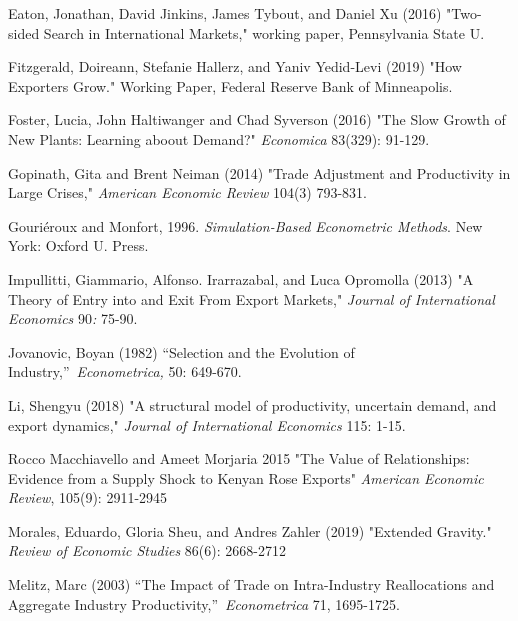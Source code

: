 \documentclass[12pt]{article}
\begin{document}
\begin{description}
\item Eaton, Jonathan, David Jinkins, James Tybout, and Daniel Xu (2016)
"Two-sided Search in International Markets," working paper, Pennsylvania
State U.

\item Fitzgerald, Doireann, Stefanie Hallerz, and Yaniv Yedid-Levi (2019)
"How Exporters Grow." Working Paper, Federal Reserve Bank of Minneapolis.

\item Foster, Lucia, John Haltiwanger and Chad Syverson (2016) "The Slow
Growth of New Plants: Learning aboout Demand?" \textit{Economica} 83(329):
91-129.

\item Gopinath, Gita and Brent Neiman (2014) "Trade Adjustment and
Productivity in Large Crises," \textit{American Economic Review} 104(3)
793-831.

\item Gouri\'{e}roux and Monfort, 1996. \textit{Simulation-Based Econometric
Methods}. New York: Oxford U. Press.

\item Impullitti, Giammario, Alfonso. Irarrazabal, and Luca Opromolla (2013)
"A Theory of Entry into and Exit From Export Markets," \textit{Journal of
International Economics} 90\textit{: }75-90.

\item Jovanovic, Boyan (1982) \textquotedblleft Selection and the Evolution
of Industry,\textquotedblright\ \textit{Econometrica,} 50: 649-670.

\item Li, Shengyu (2018) "A structural model of productivity, uncertain
demand, and export dynamics," \textit{Journal of International Economics}
115: 1-15.

\item Rocco Macchiavello and Ameet Morjaria 2015 "The Value of
Relationships: Evidence from a Supply Shock to Kenyan Rose Exports" \textit{%
American Economic Review}, 105(9): 2911-2945

\item Morales, Eduardo, Gloria Sheu, and Andres Zahler (2019) "Extended
Gravity." \textit{Review of Economic Studies} 86(6): 2668-2712

\item Melitz, Marc (2003) \textquotedblleft The Impact of Trade on
Intra-Industry Reallocations and Aggregate Industry
Productivity,\textquotedblright\ \textit{Econometrica }71, 1695-1725.


\end{description}
\end{document}

